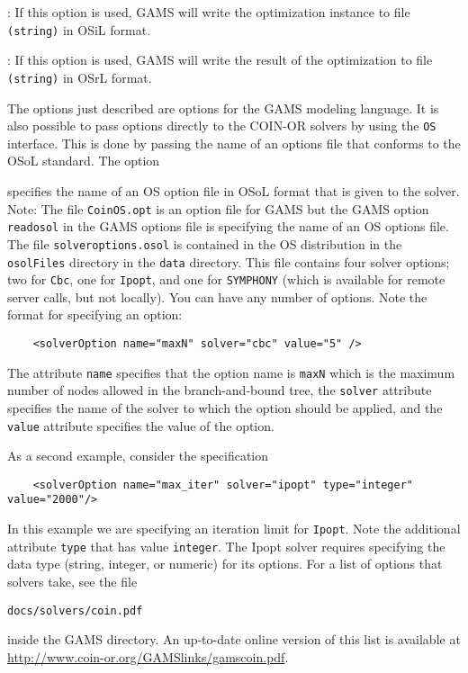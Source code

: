 \vskip 8pt
:  If this option is used, GAMS will write the optimization instance 
to file {\tt (string)} in    OSiL   format.
\vskip 8pt

\vskip 8pt
:  If this option is used, GAMS will write the result of the optimization 
to file {\tt (string)} in OSrL  format.
\vskip 8pt

The options just described are options for the GAMS modeling language.  
It is also possible to pass options directly to the COIN-OR solvers by using the {\tt OS} interface.
This is done by passing the name of an options file that conforms to the  OSoL  standard.  
The option

\vskip 8pt
  specifies the name of an OS option  file in OSoL format that is 
given to the solver.  Note: The file  {\tt CoinOS.opt} is an option  file for GAMS but the GAMS option 
{\tt readosol} in the GAMS options file  is specifying the name of an OS options file. 
\vskip 8pt
The file {\tt solveroptions.osol} is contained in the OS distribution in the {\tt osolFiles} directory   
in the {\tt data} directory. This file contains four solver options; two for {\tt Cbc}, one for {\tt Ipopt},
and one for {\tt SYMPHONY} (which is available for remote server calls, but not locally).  
You can have any number of options. Note the format for specifying an option:
\begin{verbatim}
    <solverOption name="maxN" solver="cbc" value="5" />
\end{verbatim}
The attribute {\tt name} specifies that the option name is {\tt maxN} which is the maximum number of nodes 
allowed in the branch-and-bound tree, the {\tt solver} attribute specifies the name of the solver to which
the option should be applied, and the {\tt value} attribute specifies the value of the option. 

As a second example, consider the specification
\begin{verbatim}
    <solverOption name="max_iter" solver="ipopt" type="integer" value="2000"/> 
\end{verbatim}
In this example we are specifying an iteration limit for {\tt Ipopt}.  Note the additional attribute 
{\tt type} that has value  {\tt integer}. The Ipopt solver requires specifying the data type 
(string, integer, or numeric) for its options.   For a list of options that solvers take, 
see the file
\begin{verbatim}
docs/solvers/coin.pdf
\end{verbatim}
inside the GAMS directory. 
An up-to-date online version of this list is available at \url{http://www.coin-or.org/GAMSlinks/gamscoin.pdf}.

